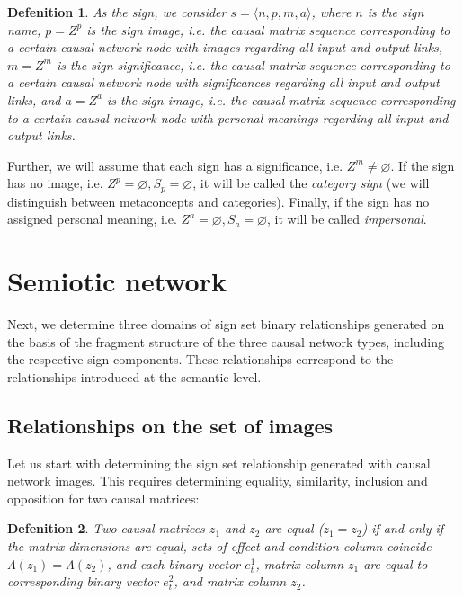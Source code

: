 \documentclass[review]{elsarticle}
\newtheorem{definition}{Defenition}
\begin{document}
\begin{definition}
	As the sign, we consider $s=\langle n, p, m, a \rangle$, where $n$ is the sign name, $p=Z^p$ is the sign image, i.e. the causal matrix sequence corresponding to a certain causal network node with images regarding all input and output links, $m=Z^m$ is the sign significance, i.e. the causal matrix sequence corresponding to a certain causal network node with significances regarding all input and output links, and $a=Z^a$ is the sign image, i.e. the causal matrix sequence corresponding to a certain causal network node with personal meanings regarding all input and output links.
\end{definition}

Further, we will assume that each sign has a significance, i.e. $Z^m\not = \varnothing$. If the sign has no image, i.e. $Z^p=\varnothing,S_p=\varnothing$, it will be called the \textit{category sign} (we will distinguish between metaconcepts and categories). Finally, if the sign has no assigned personal meaning, i.e. $Z^a=\varnothing, S_a=\varnothing$, it will be called \textit{impersonal}.

\section{Semiotic network}\label{sec:semnetwork}

Next, we determine three domains of sign set binary relationships generated on the basis of the fragment structure of the three causal network types, including the respective sign components. These relationships correspond to the relationships introduced at the semantic level.

\subsection{Relationships on the set of images}	

Let us start with determining the sign set relationship generated with causal network images. This requires determining equality, similarity, inclusion and opposition for two causal matrices:

\begin{definition}
	Two causal matrices $z_1$ and $z_2$ are equal ($z_1=z_2$) if and only if the matrix dimensions are equal, sets of effect and condition column coincide $\Lambda({z_1})=\Lambda({z_2})$, and each binary vector $e_t^1$, matrix column $z_1$ are equal to corresponding binary vector $e_t^2$, and matrix column $z_2$.
\end{definition}
\end{document}
